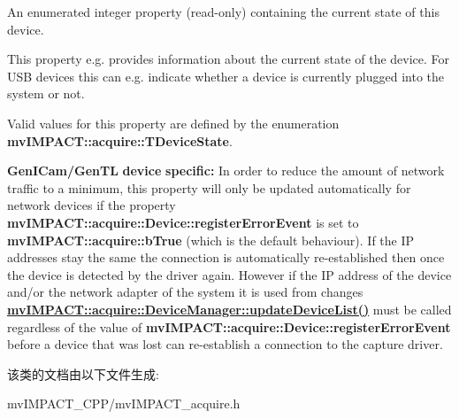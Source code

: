 An enumerated integer property {\bfseries }(read-\/only) containing the current state of this device. 

This property e.\+g. provides information about the current state of the device. For U\+S\+B devices this can e.\+g. indicate whether a device is currently plugged into the system or not.

Valid values for this property are defined by the enumeration {\bfseries mv\+I\+M\+P\+A\+C\+T\+::acquire\+::\+T\+Device\+State}.

{\bfseries Gen\+I\+Cam/\+Gen\+T\+L} {\bfseries device} {\bfseries specific\+:} In order to reduce the amount of network traffic to a minimum, this property will only be updated automatically for network devices if the property {\bfseries mv\+I\+M\+P\+A\+C\+T\+::acquire\+::\+Device\+::register\+Error\+Event} is set to {\bfseries mv\+I\+M\+P\+A\+C\+T\+::acquire\+::b\+True} (which is the default behaviour). If the I\+P addresses stay the same the connection is automatically re-\/established then once the device is detected by the driver again. However if the I\+P address of the device and/or the network adapter of the system it is used from changes {\bfseries \hyperlink{classmv_i_m_p_a_c_t_1_1acquire_1_1_device_manager_a2078f9532f67854352c3be3e32364879}{mv\+I\+M\+P\+A\+C\+T\+::acquire\+::\+Device\+Manager\+::update\+Device\+List()}} must be called regardless of the value of {\bfseries mv\+I\+M\+P\+A\+C\+T\+::acquire\+::\+Device\+::register\+Error\+Event} before a device that was lost can re-\/establish a connection to the capture driver. 

该类的文档由以下文件生成\+:\begin{DoxyCompactItemize}
\item 
mv\+I\+M\+P\+A\+C\+T\+\_\+\+C\+P\+P/mv\+I\+M\+P\+A\+C\+T\+\_\+acquire.\+h\end{DoxyCompactItemize}
